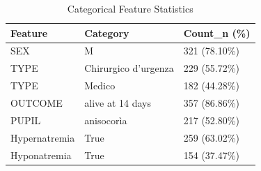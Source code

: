 \begin{table}[h!]
	\centering
	\small %
	\begin{tabular}{lll}
		\hline
		\textbf{Feature} & \textbf{Category} & \textbf{Count\_n (\%)} \\
		\hline
		SEX & M & 321 (78.10\%) \\
		TYPE & Chirurgico d’urgenza & 229 (55.72\%) \\
		TYPE & Medico & 182 (44.28\%) \\
		OUTCOME & alive at 14 days & 357 (86.86\%) \\
		PUPIL & anisocorìa & 217 (52.80\%) \\
		Hypernatremia & True & 259 (63.02\%) \\ 
		Hyponatremia & True & 154 (37.47\%) \\
		\hline
	\end{tabular}
	\caption{Categorical Feature Statistics}
	\label{tab:categorical_features}
\end{table}


